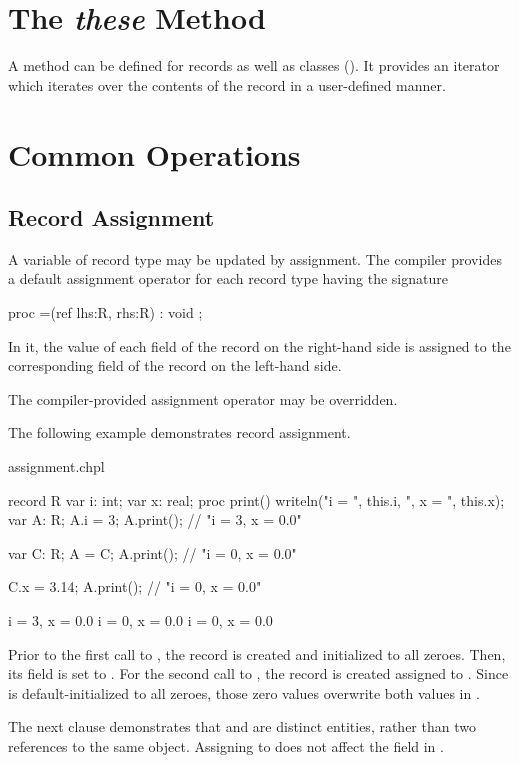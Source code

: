 \section{The {\em these} Method}

A  method can be defined for records as well as classes ().  It
provides an iterator which iterates over the contents of the record in a
user-defined manner.

\section{Common Operations}

\subsection{Record Assignment}
\label{Record_Assignment}

A variable of record type may be updated by assignment.  The compiler provides
a default assignment operator for each record type  having the signature
\begin{example}
\begin{chapel}
proc =(ref lhs:R, rhs:R) : void ;
\end{chapel}
\end{example}
\noindent
In it, the value of each field of the record on the right-hand side is assigned
to the corresponding field of the record on the left-hand side.

The compiler-provided assignment operator may be overridden.

The following example demonstrates record assignment.
\begin{chapelexample}{assignment.chpl}
\begin{chapel}
record R {
  var i: int;
  var x: real;
  proc print() { writeln("i = ", this.i, ", x = ", this.x); }
}
var A: R;
A.i = 3;
A.print();	// "i = 3, x = 0.0"

var C: R;
A = C;
A.print();	// "i = 0, x = 0.0"

C.x = 3.14;
A.print();	// "i = 0, x = 0.0"
\end{chapel}
\begin{chapeloutput}
i = 3, x = 0.0
i = 0, x = 0.0
i = 0, x = 0.0
\end{chapeloutput}
Prior to the first call to , the record  is created and
initialized to all zeroes.  Then, its  field is set to .
For the second call to , the record  is created assigned
to .  Since  is default-initialized to all zeroes, those zero
values overwrite both values in .

The next clause demonstrates that  and  are distinct entities,
rather than two references to the same object.  Assigning 
to  does not affect the  field in .
\end{chapelexample}

